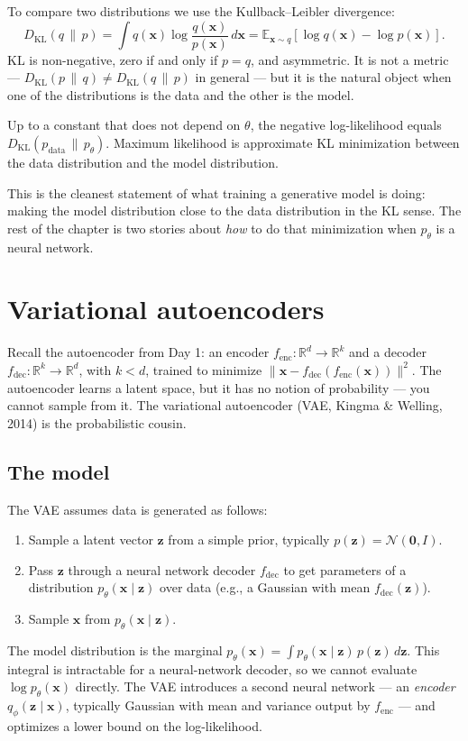 To compare two distributions we use the Kullback--Leibler divergence:
\[
D_{\mathrm{KL}}(q \,\|\, p) = \int q(\bm{x}) \log \frac{q(\bm{x})}{p(\bm{x})} \, d\bm{x} = \mathbb{E}_{\bm{x} \sim q}\!\left[ \log q(\bm{x}) - \log p(\bm{x}) \right].
\]
KL is non-negative, zero if and only if $p = q$, and asymmetric. It is not a metric --- $D_{\mathrm{KL}}(p \,\|\, q) \neq D_{\mathrm{KL}}(q \,\|\, p)$ in general --- but it is the natural object when one of the distributions is the data and the other is the model.

\begin{proposition}
Up to a constant that does not depend on $\theta$, the negative log-likelihood equals $D_{\mathrm{KL}}(p_{\text{data}} \,\|\, p_\theta)$. Maximum likelihood is approximate KL minimization between the data distribution and the model distribution.
\end{proposition}

This is the cleanest statement of what training a generative model is doing: making the model distribution close to the data distribution in the KL sense. The rest of the chapter is two stories about \emph{how} to do that minimization when $p_\theta$ is a neural network.

\section{Variational autoencoders}

Recall the autoencoder from Day 1: an encoder $f_{\text{enc}}: \mathbb{R}^d \to \mathbb{R}^k$ and a decoder $f_{\text{dec}}: \mathbb{R}^k \to \mathbb{R}^d$, with $k < d$, trained to minimize $\|\bm{x} - f_{\text{dec}}(f_{\text{enc}}(\bm{x}))\|^2$. The autoencoder learns a latent space, but it has no notion of probability --- you cannot sample from it. The variational autoencoder (VAE, Kingma \& Welling, 2014) is the probabilistic cousin.

\subsection{The model}

The VAE assumes data is generated as follows:
\begin{enumerate}
  \item Sample a latent vector $\bm{z}$ from a simple prior, typically $p(\bm{z}) = \mathcal{N}(\bm{0}, I)$.
  \item Pass $\bm{z}$ through a neural network decoder $f_{\text{dec}}$ to get parameters of a distribution $p_\theta(\bm{x} \mid \bm{z})$ over data (e.g., a Gaussian with mean $f_{\text{dec}}(\bm{z})$).
  \item Sample $\bm{x}$ from $p_\theta(\bm{x} \mid \bm{z})$.
\end{enumerate}
The model distribution is the marginal $p_\theta(\bm{x}) = \int p_\theta(\bm{x} \mid \bm{z}) \, p(\bm{z}) \, d\bm{z}$. This integral is intractable for a neural-network decoder, so we cannot evaluate $\log p_\theta(\bm{x})$ directly. The VAE introduces a second neural network --- an \emph{encoder} $q_\phi(\bm{z} \mid \bm{x})$, typically Gaussian with mean and variance output by $f_{\text{enc}}$ --- and optimizes a lower bound on the log-likelihood.

